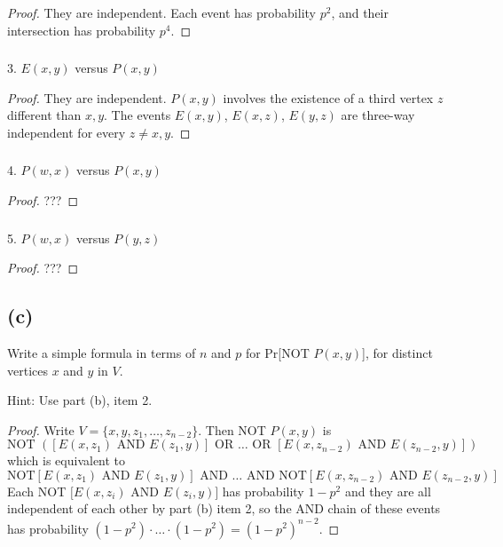 \documentclass[14pt]{extarticle}
\begin{document}
\begin{proof}
They are independent. Each event has probability $p^2$, and their intersection has probability $p^4$. 
\end{proof}

\subsubsection{}
3. $E(x, y)$ versus $P(x, y)$

\begin{proof}
They are independent. $P(x, y)$ involves the existence of a third vertex $z$ different than $x, y$. The events $E(x,y)$, $E(x,z)$, $E(y,z)$ are three-way independent for every $z \neq x,y$. 
\end{proof}

\subsubsection{}
4. $P(w, x)$ versus $P(x, y)$

\begin{proof}
???
\end{proof}

\subsubsection{}
5. $P(w, x)$ versus $P(y, z)$

\begin{proof}
???
\end{proof}

\subsection{(c)}
Write a simple formula in terms of $n$ and $p$ for Pr[NOT $P(x, y)$], for distinct vertices $x$ and $y$ in $V$.

Hint: Use part (b), item 2.
\begin{proof}
Write $V = \{x, y, z_1, \ldots, z_{n-2}\}$. Then NOT $P(x, y)$ is
$$
\text{NOT } ([E(x, z_1) \text{ AND } E(z_1, y)] \text{ OR } \ldots \text{ OR } [E(x, z_{n-2}) \text{ AND } E(z_{n-2}, y)])
$$
which is equivalent to
$$
\text{NOT}[E(x, z_1) \text{ AND } E(z_1, y)] \text{ AND } \ldots \text{ AND } \text{NOT}[E(x, z_{n-2}) \text{ AND } E(z_{n-2}, y)]
$$
Each NOT $[E(x, z_i)$ AND $E(z_i, y)]$ has probability $1-p^2$ and they are all independent of each other by part (b) item 2, so the AND chain of these events has probability $(1-p^2)\cdot \ldots \cdot (1-p^2) = (1-p^2)^{n-2}$.

\end{proof}
\end{document}
